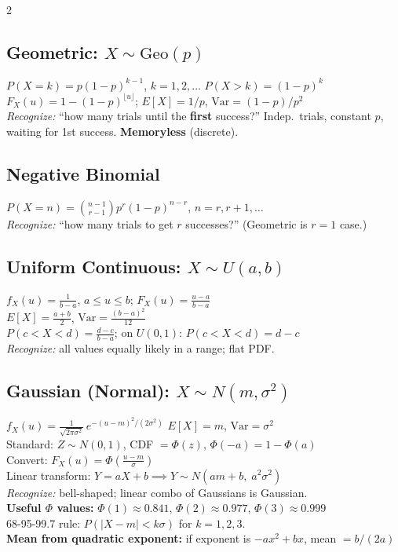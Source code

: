 \documentclass[10pt]{article}
\begin{document}
\begin{multicols*}{2}
\subsection{Geometric: $X \sim \text{Geo}(p)$}
$P(X\!=\!k) = p(1-p)^{k-1}$, $k=1,2,\ldots$\;\;
$P(X > k) = (1-p)^k$ \\
$F_X(u) = 1-(1-p)^{\lfloor u \rfloor}$;\;\;
$E[X] = 1/p$,\; $\text{Var} = (1-p)/p^2$ \\
\textit{Recognize:} ``how many trials until the \textbf{first} success?'' Indep.\ trials, constant $p$, waiting for 1st success. \textbf{Memoryless} (discrete).

\subsection{Negative Binomial}
$P(X\!=\!n) = \binom{n-1}{r-1} p^r (1-p)^{n-r}$, $n = r, r\!+\!1, \ldots$ \\
\textit{Recognize:} ``how many trials to get $r$ successes?'' (Geometric is $r=1$ case.)

\subsection{Uniform Continuous: $X \sim U(a,b)$}
$f_X(u) = \frac{1}{b-a}$, $a \le u \le b$;\;\;
$F_X(u) = \frac{u-a}{b-a}$ \\
$E[X] = \frac{a+b}{2}$,\; $\text{Var} = \frac{(b-a)^2}{12}$ \\
$P(c < X < d) = \frac{d-c}{b-a}$;\; on $U(0,1)$: $P(c<X<d) = d - c$ \\
\textit{Recognize:} all values equally likely in a range; flat PDF.

\subsection{Gaussian (Normal): $X \sim N(m, \sigma^2)$}
$f_X(u) = \frac{1}{\sqrt{2\pi\sigma^2}}\, e^{-(u-m)^2/(2\sigma^2)}$ \;\;
$E[X]=m$,\; $\text{Var}=\sigma^2$ \\
Standard: $Z \sim N(0,1)$, CDF $= \Phi(z)$, $\Phi(-a) = 1 - \Phi(a)$ \\
Convert: $F_X(u) = \Phi\!\left(\frac{u - m}{\sigma}\right)$ \\
Linear transform: $Y = aX + b \implies Y \sim N(am+b,\; a^2\sigma^2)$ \\
\textit{Recognize:} bell-shaped; linear combo of Gaussians is Gaussian. \\
\textbf{Useful $\Phi$ values:} $\Phi(1)\!\approx\!0.841$, $\Phi(2)\!\approx\!0.977$, $\Phi(3)\!\approx\!0.999$ \\
68-95-99.7 rule: $P(|X\!-\!m|<k\sigma)$ for $k=1,2,3$. \\
\textbf{Mean from quadratic exponent:} if exponent is $-ax^2 + bx$, mean $= b/(2a)$


\end{multicols*}
\end{document}
